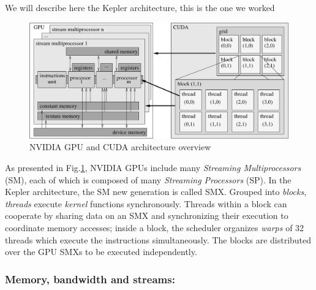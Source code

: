 We will describe here the Kepler architecture, this is the one we worked

\begin{figure}[t!]
\centering
\setlength\fboxsep{0pt}
\setlength\fboxrule{0.25pt}
\includegraphics[scale=0.6]{figures/chap1/smx}
\caption{NVIDIA GPU and CUDA architecture overview}
 \label{fig:chap1_gpu}
\end{figure}

As presented in Fig.\ref{fig:chap1_gpu}, NVIDIA GPUs include many \emph{Streaming Multiprocessors} (SM), each of which is composed of many \emph{Streaming Processors} (SP). In the Kepler architecture, the SM new generation is called SMX.
%
Grouped into \emph{blocks}, \textit{threads} execute \emph{kernel} functions synchronously.
Threads within a block can cooperate by sharing data on an SMX and synchronizing their execution to coordinate memory accesses; inside a block, the scheduler organizes \emph{warps} of 32 threads which execute the instructions simultaneously.
The blocks are distributed over the GPU SMXs to be executed independently.

\subsubsection{Memory, bandwidth and streams:}

